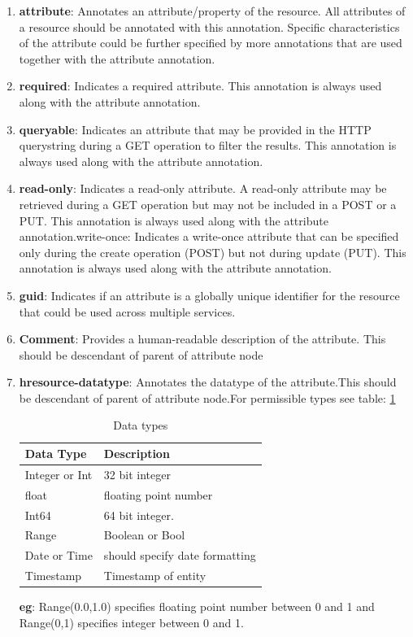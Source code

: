 \documentclass[journal]{IEEEtran}
\begin{document}
\begin{enumerate}
\item {\bf attribute}: Annotates an attribute/property of the resource. All attributes of a resource should be annotated with this annotation. Specific characteristics of the attribute could be further specified by more annotations that are used together with the attribute annotation.

\item {\bf required}: Indicates a required attribute. This annotation is always used along with the attribute annotation.

\item {\bf queryable}:  Indicates an attribute that may be provided in the HTTP querystring during a GET operation to filter the results. This annotation is always used along with the attribute annotation.

\item {\bf read-only}:  Indicates a read-only attribute. A read-only attribute may be retrieved during a GET operation but may not be included in a POST or a PUT. This annotation is always used along with the attribute annotation.write-once: Indicates a write-once attribute that can be specified only during the create operation (POST) but not during update (PUT). This annotation is always used along with the attribute annotation.

\item {\bf guid}: Indicates if an attribute is a globally unique identifier for the resource that could be used across multiple services.
\item {\bf Comment}: Provides a human-readable description of the attribute. This should be descendant of parent of attribute node

\item {\bf hresource-datatype}: Annotates the datatype of the attribute.This should be descendant of parent of attribute node.For permissible types see table: \ref{tab:data_types}

\begin{table}
    \centering
    \begin{tabular}{|l|l|}
    \hline
    Data Type      & Description                    \\ \hline
    Integer or Int &  32 bit integer                \\ \hline
    float          & floating point number          \\ \hline
    Int64          &  64 bit integer.               \\ \hline
     Range         &  Boolean or Bool               \\ \hline
    Date or Time   & should specify date formatting \\ \hline
    Timestamp      & Timestamp of entity            \\ \hline
    \end{tabular}
    \caption{Data types}
    \label{tab:data_types}
\end{table}

{\bf eg}: Range(0.0,1.0) specifies floating point number between 0 and 1 and Range(0,1) specifies integer between 0 and 1.
\end{enumerate}
\end{document}
